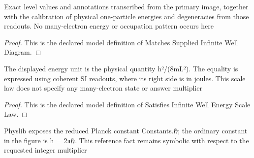 \begin{definition}
  \label{def:physics:phyx-mini-0581:phyxminiproblems-problemphyxmini0581-matchessuppliedinfinitewelldiagram}
  Exact level values and annotations transcribed from the primary image, together with the calibration of physical one-particle energies and degeneracies from those readouts. No many-electron energy or occupation pattern occurs here
\end{definition}
\begin{proof}
  This is the declared model definition of Matches Supplied Infinite Well Diagram.
\end{proof}
\begin{definition}
  \label{def:physics:phyx-mini-0581:phyxminiproblems-problemphyxmini0581-satisfiesinfinitewellenergyscalelaw}
  The displayed energy unit is the physical quantity h²/(8mL²). The equality is expressed using coherent SI readouts, where its right side is in joules. This scale law does not specify any many-electron state or answer multiplier
\end{definition}
\begin{proof}
  This is the declared model definition of Satisfies Infinite Well Energy Scale Law.
\end{proof}
\begin{definition}
  \label{def:physics:phyx-mini-0581:phyxminiproblems-problemphyxmini0581-usesordinaryplanckconstant}
  Physlib exposes the reduced Planck constant Constants.ℏ; the ordinary constant in the figure is h = 2πℏ. This reference fact remains symbolic with respect to the requested integer multiplier
\end{definition}
